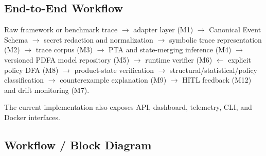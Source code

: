\documentclass[11pt,a4paper]{article}
\begin{document}
\subsection{End-to-End Workflow}

Raw framework or benchmark trace
$\rightarrow$ adapter layer (M1)
$\rightarrow$ Canonical Event Schema
$\rightarrow$ secret redaction and normalization
$\rightarrow$ symbolic trace representation (M2)
$\rightarrow$ trace corpus (M3)
$\rightarrow$ PTA and state-merging inference (M4)
$\rightarrow$ versioned PDFA model repository (M5)
$\rightarrow$ runtime verifier (M6)
$\leftarrow$ explicit policy DFA (M8)
$\rightarrow$ product-state verification
$\rightarrow$ structural/statistical/policy classification
$\rightarrow$ counterexample explanation (M9)
$\rightarrow$ HITL feedback (M12)
and drift monitoring (M7).

The current implementation also exposes API, dashboard, telemetry, CLI, and Docker
interfaces.

\subsection{Workflow / Block Diagram}
\end{document}
